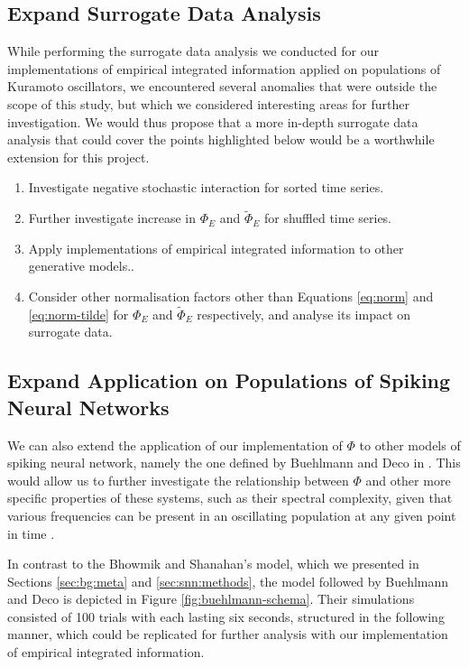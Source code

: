 \documentclass[a4paper,11pt]{article}
\begin{document}
\subsection{Expand Surrogate Data Analysis}
\label{sec:fw:surrogate}
While performing the surrogate data analysis we conducted for our implementations of empirical integrated information applied on populations of Kuramoto oscillators, we encountered several anomalies that were outside the scope of this study, but which we considered interesting areas for further investigation. We would thus propose that a more in-depth surrogate data analysis that could cover the points highlighted below would be a worthwhile extension for this project.

\begin{enumerate}
\item{Investigate negative stochastic interaction for sorted time series.}
\item{Further investigate increase in $\Phi_E$ and $\widetilde{\Phi}_E$ for shuffled time series.}
\item{Apply implementations of empirical integrated information to other generative models.}.
\item{Consider other normalisation factors other than Equations \ref{eq:norm} and \ref{eq:norm-tilde} for $\Phi_E$ and $\widetilde{\Phi}_E$ respectively, and analyse its impact on surrogate data.}
\end{enumerate}

\subsection{Expand Application on Populations of Spiking Neural Networks}
\label{sec:fw:snn}
We can also extend the application of our implementation of $\Phi$ to other models of spiking neural network, namely the one defined by Buehlmann and Deco in \cite{Buehlmann2010}. This would allow us to further investigate the relationship between $\Phi$ and other more specific properties of these systems, such as their spectral complexity, given that various frequencies can be present in an oscillating population at any given point in time \cite{Bhowmik2013}.

In contrast to the Bhowmik and Shanahan's model, which we presented in Sections \ref{sec:bg:meta} and \ref{sec:snn:methods}, the model followed by Buehlmann and Deco is depicted in Figure \ref{fig:buehlmann-schema}. Their simulations consisted of 100 trials with each lasting six seconds, structured in the following manner, which could be replicated for further analysis with our implementation of empirical integrated information.
\end{document}

